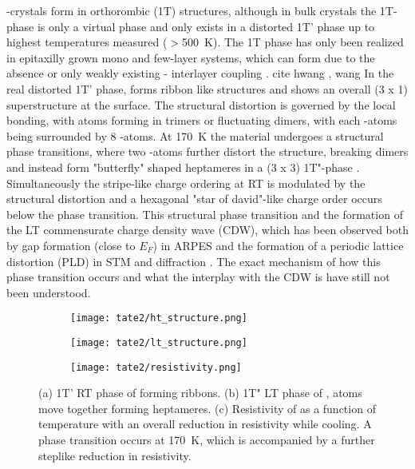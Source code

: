 -crystals form in orthorombic (1T) structures, although in bulk crystals the 1T-phase is only a virtual phase and only exists in a distorted 1T' phase up to highest temperatures measured ($>$\qty{500}{\kelvin}).
The 1T phase has only been realized in epitaxilly grown mono and few-layer systems, which can form due to the absence or only weakly existing - interlayer coupling \cite{}. cite hwang , wang
In the real distorted 1T' phase,  forms ribbon like structures and shows an overall (3 x 1) superstructure at the surface.
The structural distortion is governed by the local bonding, with  atoms forming in trimers or fluctuating dimers, with each -atoms being surrounded by 8 -atoms.
At \qty{170}{\kelvin} the material undergoes a structural phase transitions, where two -atoms further distort the structure, breaking dimers and instead form "butterfly" shaped heptameres in a (3 x 3) 1T"-phase \cite{feng_charge_2016, katayama_observation_2023}.
Simultaneously the stripe-like charge ordering at RT is modulated by the structural distortion and a hexagonal "star of david"-like charge order occurs below the phase transition.
This structural phase transition and the formation of the LT commensurate charge density wave (CDW), which has been observed both by gap formation (close to $E_F$) in ARPES \cite{lin_evidence_2022, mitsuishi_unveiling_2024} and the formation of a periodic lattice distortion (PLD) in STM and diffraction \cite{feng_charge_2016, siddiqui_ultrafast_2021, domrose_femtosecond_2024}.
The exact mechanism of how this phase transition occurs and what the interplay with the CDW is have still not been understood.

\begin{figure}
	\centering
	\begin{subfigure}[b]{0.3\textwidth}
		\texttt{[image: tate2/ht\_structure.png]}
	\end{subfigure}
	\hfill
	\begin{subfigure}[b]{0.3\textwidth}
		\texttt{[image: tate2/lt\_structure.png]}
	\end{subfigure}
	\hfill
	\begin{subfigure}[b]{0.3\textwidth}
		\texttt{[image: tate2/resistivity.png]}
	\end{subfigure}
	\caption{(a) 1T' RT phase of  forming ribbons. (b) 1T" LT phase of ,  atoms move together forming heptameres. (c) Resistivity of  as a function of temperature with an overall reduction in resistivity while cooling. A phase transition occurs at \qty{170}{\kelvin}, which is accompanied by a further steplike reduction in resistivity.}
	\label{fig:tate_structure}
\end{figure}


